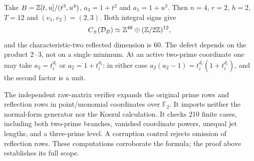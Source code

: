 \begin{example}
Take $B=\mathbb{Z}[t,u]/(t^3,u^4)$,
$a_3=1+t^2$ and $a_5=1+u^3$. Then $n=4$, $r=2$, $h=2$,
$T=12$ and $(v_1,v_2)=(2,3)$. Both integral signs give
\[
 C_\pm(\mathcal D_B)\simeq\mathbb{Z}^{48}\oplus(\mathbb{Z}/2\mathbb{Z})^{12},
\]
and the characteristic-two reflected dimension is $60$.
The defect depends on the product $2\cdot3$, not on a single minimum.
At an active two-prime coordinate one may take $a_2=t_i^{d_i}$
or $a_2=1+t_i^{d_i}$: in either case
$a_2(a_2-1)=t_i^{d_i}(1+t_i^{d_i})$, and the second factor is a unit.
\end{example}

The independent raw-matrix verifier expands the original prime rows and
reflection rows in point/monomial coordinates over $\mathbb F_2$.
It imports neither the normal-form generator nor the Koszul calculation.
It checks 210 finite cases, including both two-prime branches, vanished
coordinate powers, unequal jet lengths, and a three-prime level. A
corruption control rejects omission of reflection rows. These computations
corroborate the formula; the proof above establishes its full scope.
